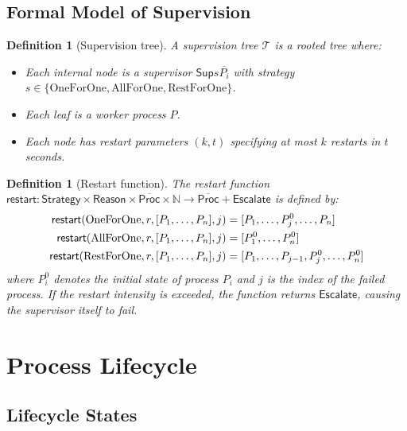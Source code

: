\documentclass[11pt,a4paper]{article}
\newtheorem{definition}[theorem]{Definition}
\newcommand{\Proc}{\mathsf{Proc}}
\newcommand{\Sup}{\mathsf{Sup}}
\begin{document}
\subsection{Formal Model of Supervision}

\begin{definition}[Supervision tree]\label{def:suptree}
A supervision tree $\mathcal{T}$ is a rooted tree where:
\begin{itemize}
\item Each internal node is a supervisor $\Sup{s}{\overline{P_i}}$ with strategy $s \in \{\text{OneForOne}, \text{AllForOne}, \text{RestForOne}\}$.
\item Each leaf is a worker process $P$.
\item Each node has restart parameters $(k, t)$ specifying at most $k$ restarts in $t$ seconds.
\end{itemize}
\end{definition}

\begin{definition}[Restart function]\label{def:restart}
The restart function $\mathsf{restart} : \mathsf{Strategy} \times \mathsf{Reason} \times \overline{\Proc} \times \mathbb{N} \to \overline{\Proc} + \mathsf{Escalate}$ is defined by:
\begin{align}
\mathsf{restart}(\text{OneForOne}, r, [P_1, \ldots, P_n], j) &= [P_1, \ldots, P_j^0, \ldots, P_n] \notag \\
\mathsf{restart}(\text{AllForOne}, r, [P_1, \ldots, P_n], j) &= [P_1^0, \ldots, P_n^0] \notag \\
\mathsf{restart}(\text{RestForOne}, r, [P_1, \ldots, P_n], j) &= [P_1, \ldots, P_{j-1}, P_j^0, \ldots, P_n^0] \notag
\end{align}
where $P_i^0$ denotes the initial state of process $P_i$ and $j$ is the index of the failed process. If the restart intensity is exceeded, the function returns $\mathsf{Escalate}$, causing the supervisor itself to fail.
\end{definition}


\section{Process Lifecycle}\label{sec:lifecycle}

\subsection{Lifecycle States}
\end{document}
